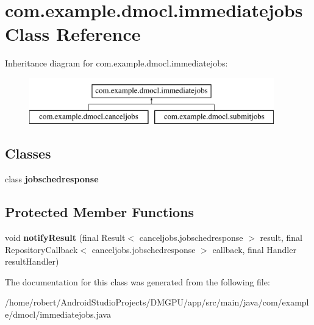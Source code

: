 \hypertarget{classcom_1_1example_1_1dmocl_1_1immediatejobs}{}\section{com.\+example.\+dmocl.\+immediatejobs Class Reference}
\label{classcom_1_1example_1_1dmocl_1_1immediatejobs}
Inheritance diagram for com.\+example.\+dmocl.\+immediatejobs\+:\begin{figure}[H]
\begin{center}
\leavevmode
\includegraphics[height=2.000000cm]{classcom_1_1example_1_1dmocl_1_1immediatejobs}
\end{center}
\end{figure}
\subsection*{Classes}
\begin{DoxyCompactItemize}
\item 
class {\bfseries jobschedresponse}
\end{DoxyCompactItemize}
\subsection*{Protected Member Functions}
\begin{DoxyCompactItemize}
\item 
\mbox{\label{classcom_1_1example_1_1dmocl_1_1immediatejobs_a5b2d3120e14b08e5712a4bce8728b60d}} 
void {\bfseries notify\+Result} (final Result$<$ canceljobs.\+jobschedresponse $>$ result, final Repository\+Callback$<$ canceljobs.\+jobschedresponse $>$ callback, final Handler result\+Handler)
\end{DoxyCompactItemize}


The documentation for this class was generated from the following file\+:\begin{DoxyCompactItemize}
\item 
/home/robert/\+Android\+Studio\+Projects/\+D\+M\+G\+P\+U/app/src/main/java/com/example/dmocl/immediatejobs.\+java\end{DoxyCompactItemize}
